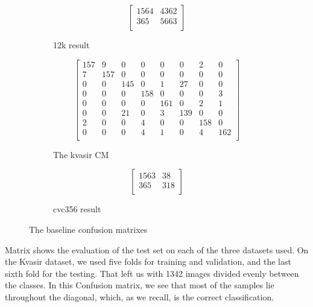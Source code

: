 \begin{figure}
\advance\leftskip-1.6cm
	\begin{subfigure}[b]{0.3\textwidth}
         \[
		\begin{bmatrix}
		1564 & 4362\\
		  365  & 5663\\
		\end{bmatrix}
		\]
         \caption{12k result}
         \label{mat:cvc12kCM}
     \end{subfigure} 
     \begin{subfigure}[b]{0.5\textwidth}
     \centering
         \small
         \[
		\begin{bmatrix}
		157&   9 &  0 &  0 &  0 &  0 &  2 &  0\\
		  7  &157  & 0  & 0  & 0  & 0  & 0  & 0\\
		  0  & 0 &145  & 0  & 1 & 27 &  0  & 0\\
		  0  & 0 &  0 & 158 &  0 &  0 &  0  &  3\\
		  0  & 0  & 0 &  0 & 161 &  0 &  2  &  1\\
		  0  & 0 & 21 &  0 &  3& 139 &  0 &  0\\
		  2  & 0 &  0 &  4 &  0 &  0 & 158 &  0\\
		  0  & 0  & 0 &  4 &  1 &  0 &  4 & 162\\
		\end{bmatrix}
		\]
         \caption{The kvasir CM}
         \label{mat:kvasirCM}
     \end{subfigure}
     \begin{subfigure}[b]{0.3\textwidth}
         \[
		\begin{bmatrix}
		1563 &  38\\
	 	365 &  318\\
		\end{bmatrix}
		\]
         \caption{cvc356 result}
         \label{mat:cvc356CM}
     \end{subfigure}
     \advance\rightskip-1.6cm
      \caption{The baseline confusion matrixes}
        \label{fig:BaselineCM}
\end{figure}

Matrix  shows the evaluation of the test set on each of the three datasets used. 
On the Kvasir dataset, we used five folds for training and validation, and the last sixth fold for the testing. That left us with 1342 images divided evenly between the classes. 
In this Confusion matrix, we see that most of the samples lie throughout the diagonal, which, as we recall, is the correct classification.

